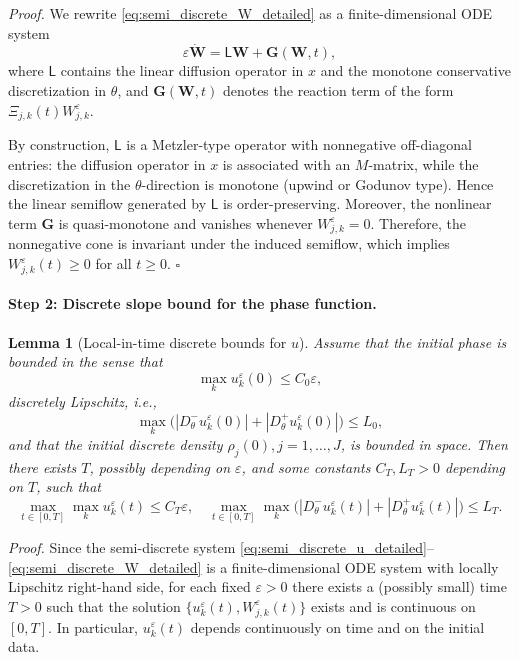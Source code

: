\documentclass[11pt, dina4, amsfont12]{article}
\newtheorem{lemma}{Lemma}[section]
\begin{document}
\textit{Proof.}
We rewrite \eqref{eq:semi_discrete_W_detailed} as a finite-dimensional ODE system
\[
\varepsilon \dot{\mathbf W}
=
\mathsf{L}\mathbf W + \mathbf G(\mathbf W,t),
\]
where $\mathsf{L}$ contains the linear diffusion operator in $x$ and the monotone
conservative discretization in $\theta$, and $\mathbf G(\mathbf W,t)$ denotes the
reaction term of the form $\Xi_{j,k}(t)W_{j,k}^\varepsilon$.

By construction, $\mathsf{L}$ is a Metzler-type operator with nonnegative
off-diagonal entries: the diffusion operator in $x$ is associated with an
$M$-matrix, while the discretization in the $\theta$-direction is monotone
(upwind or Godunov type). Hence the linear semiflow generated by $\mathsf{L}$ is
order-preserving. Moreover, the nonlinear term $\mathbf G$ is quasi-monotone and
vanishes whenever $W_{j,k}^\varepsilon=0$. Therefore, the nonnegative cone is
invariant under the induced semiflow, which implies
$W_{j,k}^\varepsilon(t)\ge0$ for all $t\ge0$.
\hfill$\square$

\medskip

\paragraph{Step 2: Discrete slope bound for the phase function.}

\begin{lemma}[Local-in-time discrete bounds for $u$]\label{lem:slope_u}
Assume that the initial phase is bounded in the sense that
\[
    \max_k u_k^\varepsilon(0) \le C_0 \varepsilon, 
\]
discretely Lipschitz, i.e.,
\begin{equation}\label{eq:u0_lip}
\max_{k}\Big(|D_\theta^-u_k^\varepsilon(0)|+|D_\theta^+u_k^\varepsilon(0)|\Big)
\le L_0,
\end{equation}
and that the initial discrete density $\rho_j(0), j=1,\dots,J$, is bounded in space. 
Then there exists $T$, possibly depending on $\varepsilon$, and some constants $C_T, L_T>0$ depending on $T$, such that
\[
\max_{t\in[0,T]}\max_k u_k^\varepsilon(t) \le C_T \varepsilon, 
\quad
\max_{t\in[0,T]}\max_{k}
\Big(|D_\theta^-u_k^\varepsilon(t)|
    +|D_\theta^+u_k^\varepsilon(t)|\Big)
\le L_T .
\]
\end{lemma}

\textit{Proof.}
Since the semi-discrete system
\eqref{eq:semi_discrete_u_detailed}--\eqref{eq:semi_discrete_W_detailed}
is a finite-dimensional ODE system with locally Lipschitz right-hand side,
for each fixed $\varepsilon>0$ there exists a (possibly small) time
$T>0$ such that the solution
$\{u_k^\varepsilon(t),W_{j,k}^\varepsilon(t)\}$ exists and is continuous on $[0,T]$.
In particular, $u_k^\varepsilon(t)$ depends continuously on time and on the
initial data.
\end{document}
